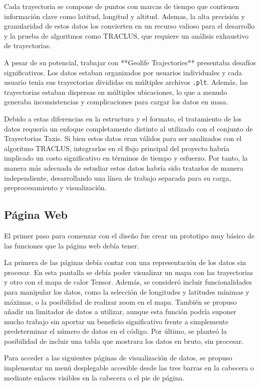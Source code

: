 Cada trayectoria se compone de puntos con marcas de tiempo que contienen información clave como latitud, longitud y altitud. Ademas, la alta precisión y granularidad de estos datos los convierten en un recurso valioso para el desarrollo y la prueba de algoritmos como TRACLUS, que requiere un análisis exhaustivo de trayectorias.

A pesar de su potencial, trabajar con **Geolife Trajectories** presentaba desafíos significativos. Los datos estaban organizados por usuarios individuales y cada usuario tenía sus trayectorias divididas en múltiples archivos \texttt{.plt}. Además, las trayectorias estaban dispersas en múltiples ubicaciones, lo que a menudo generaba inconsistencias y complicaciones para cargar los datos en masa. 

Debido a estas diferencias en la estructura y el formato, el tratamiento de los datos requería un enfoque completamente distinto al utilizado con el conjunto de Trayectorias Taxis. Si bien estos datos eran válidos para ser analizados con el algoritmo TRACLUS, integrarlos en el flujo principal del proyecto habría implicado un costo significativo en términos de tiempo y esfuerzo. Por tanto, la manera más adecuada de estudiar estos datos habría sido tratarlos de manera independiente, desarrollando una línea de trabajo separada para su carga, preprocesamiento y visualización.

\subsection{Página Web}

El primer paso para comenzar con el diseño fue crear un prototipo muy básico de las funciones que la página web debía tener.

La primera de las páginas debía contar con una representación de los datos sin procesar. En esta pantalla se debía poder visualizar un mapa con las trayectorias y otro con el mapa de calor Tensor. Además, se consideró incluir funcionalidades para manipular los datos, como la selección de longitudes y latitudes mínimas y máximas, o la posibilidad de realizar zoom en el mapa. También se propuso añadir un limitador de datos a utilizar, aunque esta función podría suponer mucho trabajo sin aportar un beneficio significativo frente a simplemente predeterminar el número de datos en el código. Por último, se planteó la posibilidad de incluir una tabla que mostrara los datos en bruto, sin procesar.

Para acceder a las siguientes páginas de visualización de datos, se propuso implementar un menú desplegable accesible desde las tres barras en la cabecera o mediante enlaces visibles en la cabecera o el pie de página.

